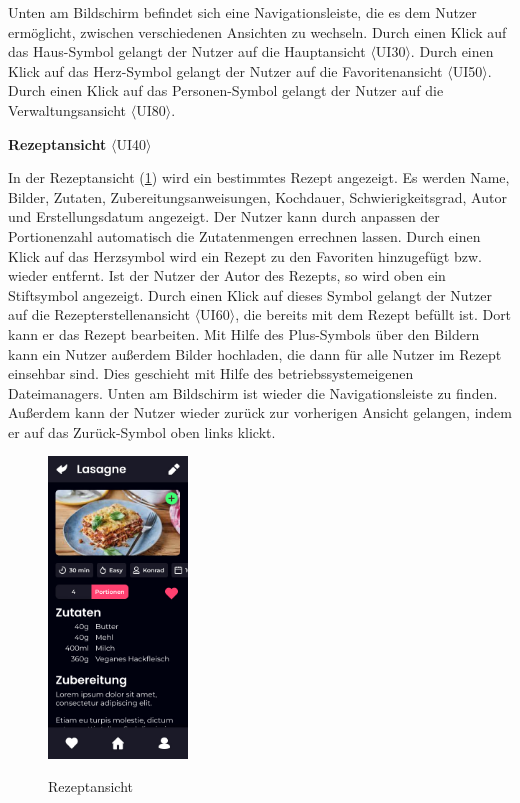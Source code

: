 \documentclass[parskip=full]{scrartcl}
\begin{document}
Unten am Bildschirm befindet sich eine Navigationsleiste, die es dem Nutzer ermöglicht, zwischen verschiedenen Ansichten zu wechseln. Durch einen Klick auf das Haus-Symbol gelangt der Nutzer auf die Hauptansicht $\langle$UI30$\rangle$. Durch einen Klick auf das Herz-Symbol gelangt der Nutzer auf die Favoritenansicht $\langle$UI50$\rangle$. Durch einen Klick auf das Personen-Symbol gelangt der Nutzer auf die Verwaltungsansicht $\langle$UI80$\rangle$.

\textbf{Rezeptansicht} $\langle$UI40$\rangle$

In der Rezeptansicht (\ref{fig:A75}) wird ein bestimmtes Rezept angezeigt. Es werden Name, Bilder, Zutaten, Zubereitungsanweisungen, Kochdauer, Schwierigkeitsgrad, Autor und Erstellungsdatum angezeigt. Der Nutzer kann durch anpassen der Portionenzahl automatisch die Zutatenmengen errechnen lassen. Durch einen Klick auf das Herzsymbol wird ein Rezept zu den Favoriten hinzugefügt bzw. wieder entfernt. Ist der Nutzer der Autor des Rezepts, so wird oben ein Stiftsymbol angezeigt. Durch einen Klick auf dieses Symbol gelangt der Nutzer auf die Rezepterstellenansicht $\langle$UI60$\rangle$, die bereits mit dem Rezept befüllt ist. Dort kann er das Rezept bearbeiten. Mit Hilfe des Plus-Symbols über den Bildern kann ein Nutzer außerdem Bilder hochladen, die dann für alle Nutzer im Rezept einsehbar sind. Dies geschieht mit Hilfe des betriebssystemeigenen Dateimanagers. Unten am Bildschirm ist wieder die Navigationsleiste zu finden. Außerdem kann der Nutzer wieder zurück zur vorherigen Ansicht gelangen, indem er auf das Zurück-Symbol oben links klickt.

\begin{figure}[!htp]
    \centering
    \includegraphics[height=80mm]{images/section7/RecipeView.jpg}
    \label{fig:A75}
    \caption{Rezeptansicht}
\end{figure}
\end{document}
